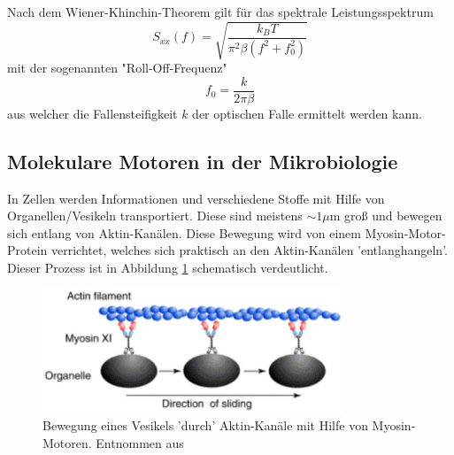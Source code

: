     Nach dem Wiener-Khinchin-Theorem gilt für das spektrale Leistungsspektrum
    \begin{equation}
      S_{xx}(f) = \sqrt{\frac{k_B T}{\pi^2\beta(f^2+f_0^2)}}
      \label{eqn:Leistung}
    \end{equation}
    mit der sogenannten "Roll-Off-Frequenz"
    \begin{equation}
      f_0 = \frac{k}{2\pi\beta}
      \label{eqn:Roll}
    \end{equation}
    aus welcher die Fallensteifigkeit $k$ der optischen Falle ermittelt werden kann.
  \subsection{Molekulare Motoren in der Mikrobiologie}
    In Zellen werden Informationen und verschiedene Stoffe mit Hilfe von Organellen/Vesikeln transportiert. Diese sind meistens $\sim 1\mu\text{m}$ groß und bewegen sich entlang von Aktin-Kanälen. Diese Bewegung wird von einem Myosin-Motor-Protein verrichtet, welches sich praktisch an den Aktin-Kanälen 'entlanghangeln'. Dieser Prozess ist in Abbildung \ref{fig:Motor} schematisch verdeutlicht.
    \begin{figure}[h]
      \centering
      \includegraphics[width = 0.8\textwidth]{pictures/Motor.png}
      \caption{Bewegung eines Vesikels 'durch' Aktin-Kanäle mit Hilfe von Myosin-Motoren. Entnommen aus \cite{tu_dortmund_versuchsanleitung_OptischePinzette}}
      \label{fig:Motor}
    \end{figure}
    